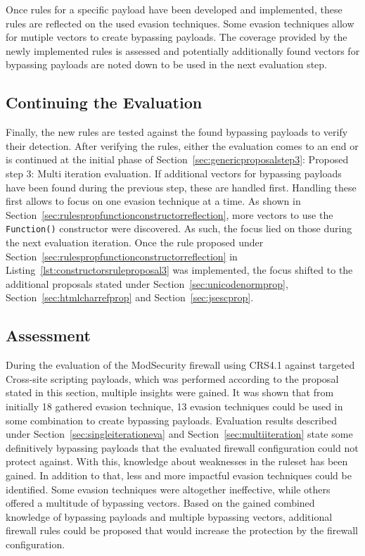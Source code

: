 Once rules for a specific payload have been developed and implemented, these rules are reflected on the used evasion techniques. Some evasion techniques allow for mutiple vectors to create bypassing payloads. The coverage provided by the newly implemented rules is assessed and potentially additionally found vectors for bypassing payloads are noted down to be used in the next evaluation step. 
\subsection{Continuing the Evaluation}
Finally, the new rules are tested against the found bypassing payloads to verify their detection. After verifying the rules, either the evaluation comes to an end or is continued at the initial phase of Section~\ref{sec:genericproposalstep3}: Proposed step 3: Multi iteration evaluation. If additional vectors for bypassing payloads have been found during the previous step, these are handled first. Handling these first allows to focus on one evasion technique at a time. As shown in Section~\ref{sec:rulespropfunctionconstructorreflection}, more vectors to use the \verb|Function()| constructor were discovered. As such, the focus lied on those during the next evaluation iteration. Once the rule proposed under Section~\ref{sec:rulespropfunctionconstructorreflection} in Listing~\ref{lst:constructorsruleproposal3} was implemented, the focus shifted to the additional proposals stated under Section~\ref{sec:unicodenormprop}, Section~\ref{sec:htmlcharrefprop} and Section~\ref{sec:jsescprop}.

\subsection{Assessment} 
During the evaluation of the ModSecurity firewall using CRS4.1 against targeted Cross-site scripting payloads, which was performed according to the proposal stated in this section, multiple insights were gained. It was shown that from initially 18 gathered evasion technique, 13 evasion techniques could be used in some combination to create bypassing payloads. Evaluation results described under Section~\ref{sec:singleiterationeva} and Section~\ref{sec:multiiteration} state some definitively bypassing payloads that the evaluated firewall configuration could not protect against. With this, knowledge about weaknesses in the ruleset has been gained. In addition to that, less and more impactful evasion techniques could be identified. Some evasion techniques were altogether ineffective, while others offered a multitude of bypassing vectors. Based on the gained combined knowledge of bypassing payloads and multiple bypassing vectors, additional firewall rules could be proposed that would increase the protection by the firewall configuration.

